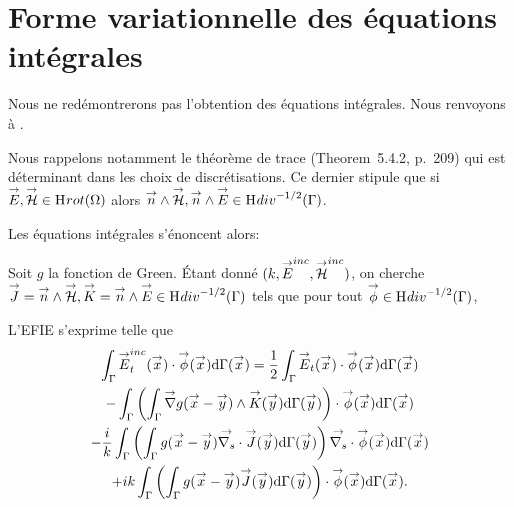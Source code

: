 


\section{Forme variationnelle des équations intégrales}

  Nous ne redémontrerons pas l'obtention des équations intégrales. Nous renvoyons à \cite[Section~5.5, p.~234]{nedelec_acoustic_2001}.

  Nous rappelons notamment le théorème de trace (Theorem~5.4.2, p.~209) qui est déterminant dans les choix de discrétisations. Ce dernier stipule que si \(\vE,\vH \in \Sobolev[rot]{(\Omega)}\) alors \(\vn \pvect \vH,\vn \pvect \vE \in \Sobolev[div]^{-1/2}{(\Gamma)}\). 

  Les équations intégrales s'énoncent alors:

  Soit \(g\) la fonction de Green. Étant donné \((k,\vE^{inc},\vH^{inc})\), on cherche \(\vJ = \vn \pvect \vH, \vK = \vn \pvect \vE \in \Sobolev[div]^{-1/2}{(\Gamma)}\)  tels que pour tout \(\vect{\phi} \in \Sobolev[div]^{-1/2}(\Gamma)\),

  L'EFIE s'exprime telle que
  \begin{multline}
    \label{eq:form_int:EFIE:var}
    \int_{\Gamma} \vE^{inc}_t(\vx) \cdot \vect{\phi}(\vx) \dd{\Gamma}(\vx) =
      \frac{1}{2} \int_{\Gamma} \vE_t(\vx) \cdot \vect{\phi}(\vx) \dd{\Gamma}(\vx) \\
        - \int_{\Gamma} \left( \int_{\Gamma} \vgrad g(\vx - \vy) \pvect \vK(\vy) \dd{\Gamma}(\vy) \right) \cdot \vect{\phi}(\vx) \dd{\Gamma}(\vx) \\
      - \frac{i}{k} \int_{\Gamma} \left( \int_{\Gamma}  g(\vx - \vy)\vdivs\vJ(\vy) \dd{\Gamma}(\vy) \right)\vdivs \vect{\phi}(\vx) \dd{\Gamma}(\vx) \\
        +  ik\int_{\Gamma} \left( \int_{\Gamma} g(\vx - \vy)\vJ(\vy) \dd{\Gamma}(\vy) \right) \cdot \vect{\phi}(\vx) \dd{\Gamma}(\vx).
  \end{multline}

